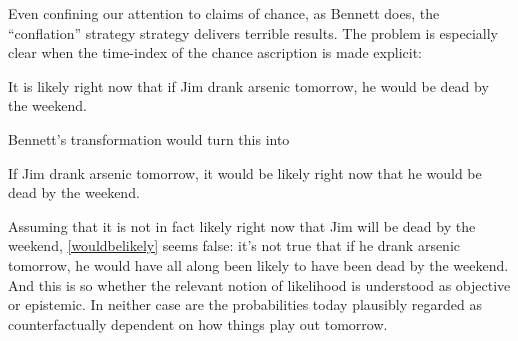 \documentclass[If.tex]{subfiles}
\begin{document}
Even confining our attention to claims of chance, as Bennett does, the “conflation” strategy strategy delivers terrible results. The problem is especially clear when the time-index of the chance ascription is made explicit:
\begin{prop}
	\nitem \label{nowlikely}
	It is likely right now that if Jim drank arsenic tomorrow, he would be dead by the weekend.
\end{prop}
Bennett's transformation would turn this into
\begin{prop}
	\nitem \label{wouldbelikely}
	If Jim drank arsenic tomorrow, it would be likely right now that he would be dead by the weekend.
\end{prop}
Assuming that it is not in fact likely right now that Jim will be dead by the weekend, \ref{wouldbelikely} seems false: it's not true that if he drank arsenic tomorrow, he would have all along been likely to have been dead by the weekend. And this is so whether the relevant notion of likelihood is understood as objective or epistemic.  In neither case are the probabilities today plausibly regarded as counterfactually dependent on how things play out tomorrow.
\end{document}
